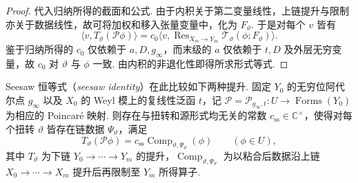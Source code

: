 \begin{proof}
代入归纳所得的截面和公式. 由于内积关于第二变量线性，上链提升与限制亦关于数据线性，故可将加权和移入张量变量中，化为 $F_\vartheta$. 于是对每个 $v$ 皆有
\[
 \big\langle v,T_\vartheta(\mathcal P\phi)\big\rangle
 =c_0\big\langle v,\operatorname{Res}_{X_m\to Y_m}
                          \mathcal T_\vartheta(\phi;F_\vartheta)\big\rangle.
\]
鉴于归纳所得的 $c_0$ 仅依赖于 $a,D,g_\infty$，而末级的 $a$ 仅依赖于 $t,D$ 及外层无穷变量，故 $c_0$ 对 $\vartheta$ 与 $\phi$ 一致. 由内积的非退化性即得所求形式等式.
\end{proof}

\begin{theorem}
\label{thm:a-seesaw}
\emitthmsource
Seesaw 恒等式（\emph{seesaw identity}）在此比较如下两种提升. 固定 $Y_0$ 的无穷位阿代尔点 $g_\infty$ 以及 $X_0$ 的 Weyl 模上的复线性泛函 $t$，记 $\mathcal P=\mathcal P_{g_\infty,t}\colon U\to\operatorname{Forms}(Y_0)$ 为相应的 Poincaré 映射. 则存在与扭转和源形式均无关的常数 $c_{\mathrm{ss}}\in\mathbb C^\times$，使得对每个扭转 $\vartheta$ 皆存在链数据 $\Psi_\vartheta$，满足
\begin{equation}
 T_\vartheta(\mathcal P\phi)
   =c_{\mathrm{ss}}\operatorname{Comp}_{\vartheta,\Psi_\vartheta}(\phi)
 \qquad(\phi\in U),
\label{eq:a-seesaw}
\end{equation}
其中 $T_\vartheta$ 为下链 $Y_0\to\cdots\to Y_m$ 的提升，$\operatorname{Comp}_{\vartheta,\Psi_\vartheta}$ 为以粘合后数据沿上链 $X_0\to\cdots\to X_m$ 提升后再限制至 $Y_m$ 所得算子.
\end{theorem}
